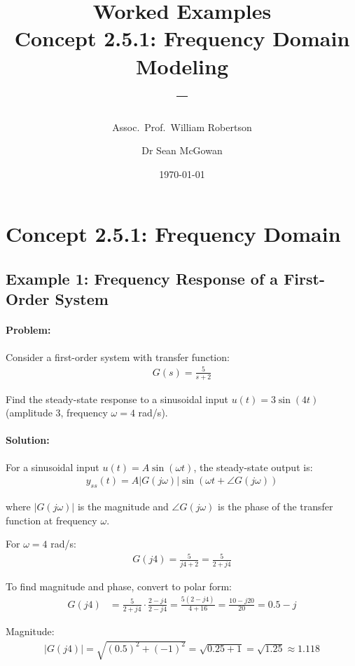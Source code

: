 \documentclass[11pt,a4paper]{article}
\title{\textbf{Worked Examples}\\[0.5em]
\large Concept 2.5.1: Frequency Domain Modeling\\[0.3em]
\normalsize \coursesubtitle{} -- \coursetitle}
\author{Assoc.\ Prof.\ William Robertson \and Dr Sean McGowan}
\date{\today}
\begin{document}
\maketitle
\tableofcontents
\newpage

\section{Concept 2.5.1: Frequency Domain}

\subsection{Example 1: Frequency Response of a First-Order System}

\paragraph{Problem:} Consider a first-order system with transfer function:
\begin{align}
  G(s) = \frac{5}{s+2}
\end{align}

Find the steady-state response to a sinusoidal input $u(t) = 3\sin(4t)$ (amplitude 3, frequency $\omega = 4$ rad/s).

\paragraph{Solution:}

For a sinusoidal input $u(t) = A\sin(\omega t)$, the steady-state output is:
\begin{align}
  y_{ss}(t) = A|G(j\omega)|\sin(\omega t + \angle G(j\omega))
\end{align}

where $|G(j\omega)|$ is the magnitude and $\angle G(j\omega)$ is the phase of the transfer function at frequency $\omega$.

For $\omega = 4$ rad/s:
\begin{align}
  G(j4) = \frac{5}{j4+2} = \frac{5}{2+j4}
\end{align}

To find magnitude and phase, convert to polar form:
\begin{align}
  G(j4) &= \frac{5}{2+j4} \cdot \frac{2-j4}{2-j4} = \frac{5(2-j4)}{4+16} = \frac{10-j20}{20} = 0.5 - j
\end{align}

Magnitude:
\begin{align}
  |G(j4)| = \sqrt{(0.5)^2 + (-1)^2} = \sqrt{0.25 + 1} = \sqrt{1.25} \approx 1.118
\end{align}
\end{document}
